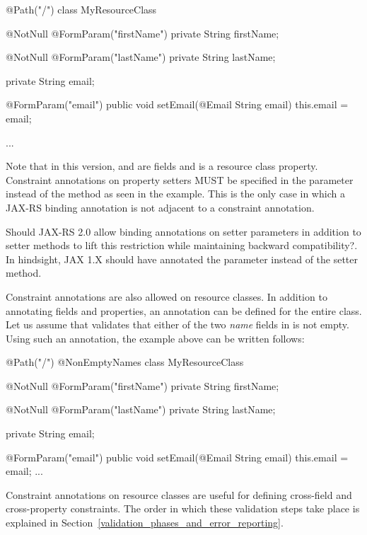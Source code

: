 \begin{listing}{1}
@Path("/")
class MyResourceClass {

    @NotNull @FormParam("firstName")
    private String firstName;

    @NotNull @FormParam("lastName")
    private String lastName;

    private String email;

    @FormParam("email")
    public void setEmail(@Email String email) {
        this.email = email;
    }

    ...
}
\end{listing}

Note that in this version,  and  are fields and  is a resource class property. Constraint annotations on property setters MUST be specified in the parameter instead of the method as seen in the example. This is the only case in which a JAX-RS binding annotation is not adjacent to a constraint annotation. 

\begin{ednote}
Should JAX-RS 2.0 allow binding annotations on setter parameters in addition to setter methods to lift this restriction while maintaining backward compatibility?. In hindsight, JAX 1.X should have annotated the parameter instead of the setter method.
\end{ednote}

Constraint annotations are also allowed on resource classes. In addition to annotating fields and properties, an annotation can be defined for the entire class. Let us assume that  validates that either of the two \emph{name} fields in  is  not empty. Using such an annotation, the example above can be written follows:

\begin{listing}{1}
@Path("/")
@NonEmptyNames
class MyResourceClass {

    @NotNull @FormParam("firstName")
    private String firstName;

    @NotNull @FormParam("lastName")
    private String lastName;

    private String email;

    @FormParam("email")
    public void setEmail(@Email String email) {
        this.email = email;
    }
    ...
}
\end{listing}

Constraint annotations on resource classes are useful for defining cross-field and cross-property constraints. The order in which these validation steps take place is explained in Section~\ref{validation_phases_and_error_reporting}.

